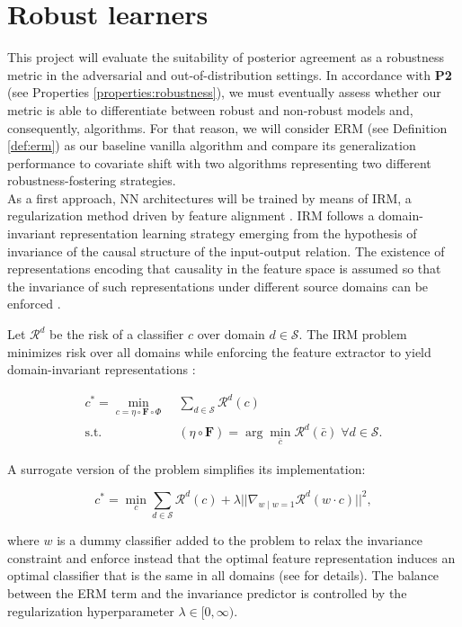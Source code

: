 \section{Robust learners}\label{sec:robust_learners}

This project will evaluate the suitability of posterior agreement as a robustness
metric in the adversarial and out-of-distribution settings. In accordance with
\textbf{P2} (see Properties \ref{properties:robustness}), we must eventually
assess whether our metric is able to differentiate between robust and non-robust
models and, consequently, algorithms. For that reason, we will consider ERM 
(see Definition \ref{def:erm}) as our baseline vanilla algorithm and compare its 
generalization performance to covariate shift with two algorithms representing two 
different robustness-fostering strategies. \\

As a first approach, NN architectures will be trained by means of IRM, a regularization method driven 
by feature alignment \cite{arjovskyInvariantRiskMinimization2020}.
IRM follows a domain-invariant representation 
learning strategy emerging from the hypothesis of invariance of the 
causal structure of the input-output relation. The existence of 
representations encoding that causality in the feature space is assumed so 
that the invariance of such representations
under different source domains can be enforced
\cite{liuOutOfDistributionGeneralizationSurvey2023}.

\begin{definition}[IRM]
    Let $\mathcal{R}^d$ be the risk of a classifier $c$
    over domain $d \in \mathcal{S}$. The IRM problem minimizes risk over all domains
    while enforcing the feature extractor to yield domain-invariant representations
    \cite{arjovskyInvariantRiskMinimization2020}:

    $$
        \begin{aligned}
            c^* = \min_{c = \eta \circ \bm{F} \circ \Phi} & \; \sum_{d \in \mathcal{S}} \mathcal{R}^d(c) \\
            \text{s.t.} & \; (\eta \circ \bm{F}) = \arg \min_{\bar{c}} \mathcal{R}^d(\bar{c}) \; \forall d \in \mathcal{S}.
        \end{aligned}
    $$

    A surrogate version of the problem simplifies its implementation:

    $$
        c^* = \min_{c} \sum_{d \in \mathcal{S}} \mathcal{R}^d(c) + \lambda || \nabla_{w \mid w = 1} \mathcal{R}^d(w \cdot c) ||^2,
    $$

    where $w$ is a dummy classifier added to the problem to relax the invariance
    constraint and enforce instead that the optimal feature representation induces
    an optimal classifier that is the same in all domains (see
    \cite{arjovskyInvariantRiskMinimization2020} for details). The balance between
    the ERM term and the invariance predictor is controlled by
    the regularization hyperparameter $\lambda \in [0, \infty)$.
\end{definition}


